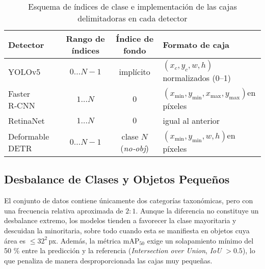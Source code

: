 \begin{table}[htbp]
\centering
\caption{Esquema de índices de clase e implementación de las cajas delimitadoras en cada detector}
\label{tab:label_schemes}

\begin{tabularx}{\textwidth}{|p{2.8cm}|c|c|>{\raggedright\arraybackslash}X|}
\hline
\textbf{Detector} &
\textbf{Rango de índices} &
\textbf{Índice de fondo} &
\textbf{Formato de caja} \\ \hline
YOLOv5            & \(0\dots N-1\) & implícito &
\((x_c,y_c,w,h)\)\newline normalizados (0–1) \\ \hline
Faster R‑CNN      & \(1\dots N\)   & \(0\) &
\((x_{\min},y_{\min},x_{\max},y_{\max})\)\newline en píxeles \\ \hline
RetinaNet         & \(1\dots N\)   & \(0\) &
igual al anterior \\ \hline
Deformable DETR   & \(0\dots N-1\) & clase \(N\) (\emph{no‑obj}) &
\((x_{\min},y_{\min},w,h)\)\newline en píxeles \\ \hline
\end{tabularx}
\end{table}



\subsection{Desbalance de Clases y Objetos Pequeños}\label{ssec:small_obj}

El conjunto de datos contiene únicamente dos categorías taxonómicas, pero con una frecuencia relativa aproximada de \(2{:}1\).
Aunque la diferencia no constituye un desbalance extremo, los modelos tienden a favorecer la clase mayoritaria y descuidan la minoritaria, sobre todo cuando esta se manifiesta en objetos cuya área es \(\le 32^{2}\)\,px.
Además, la métrica \(\text{mAP}_{50}\) exige un solapamiento mínimo del 50 \% entre la predicción y la referencia (\textit{Intersection over Union}, \textit{IoU} \(>0.5\)), lo que penaliza de manera desproporcionada las cajas muy pequeñas.

